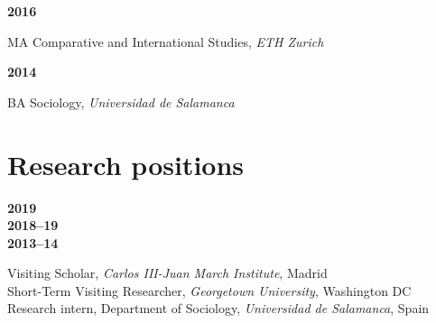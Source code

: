 \documentclass[a4paper, 12pt]{article}
\begin{document}
\vspace{10pt}

\noindent
\begin{minipage}[t]{0.1\textwidth}
  \flushleft
	\textbf{2016}
\end{minipage}
\begin{minipage}[t]{0.9\textwidth}
  MA Comparative and International Studies, \textit{ETH Zurich}
\end{minipage}


\noindent
\begin{minipage}[t]{0.1\textwidth}
  \flushleft
	\textbf{2014}
\end{minipage}
\begin{minipage}[t]{0.9\textwidth}
  BA Sociology, \textit{Universidad de Salamanca}
\end{minipage}

\vspace{0pt}
\section*{Research positions}

\begin{minipage}[t]{0.1\textwidth}
  \flushleft
  \textbf{2019}\\\vspace{7pt}
	\textbf{2018--19}\\\vspace{7pt}
	\textbf{2013--14}
\end{minipage}
\begin{minipage}[t]{0.9\textwidth}
  Visiting Scholar, {\it Carlos III-Juan March Institute}, Madrid\vspace{2pt}\\
	Short-Term Visiting Researcher, {\it Georgetown University}, Washington DC\vspace{2pt}\\
	Research intern, Department of Sociology, {\it Universidad de Salamanca}, Spain
\end{minipage}
\end{document}
